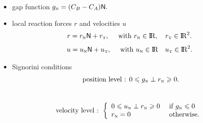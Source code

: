 {\begin{minipage}[c]{0.45\linewidth}
\begin{tikzpicture}
    \end{tikzpicture}
  \end{minipage}
\begin{minipage}[c]{0.49\linewidth}
    \begin{itemize}
    \item gap function $ g_{{\hbox{\tiny{N}}}} = (C_B-C_A) \sf N.$
    \item local reaction forces $r$ and  velocities $u$
      $$r =  r_{\hbox{\tiny{N}}} {\sf N} + r_{\hbox{\tiny{T}}}, \quad \text{ with  } r_{\hbox{\tiny{N}}} \in \mathrm{I\!R}, \quad r_{\hbox{\tiny{T}}} \in \mathrm{I\!R}^2.$$
      $$u =  u_{\hbox{\tiny{N}}} {\sf N} + u_{\hbox{\tiny{T}}}, \quad \text{ with } u_{\hbox{\tiny{N}}} \in \mathrm{I\!R} \quad u_{\hbox{\tiny{T}}} \in \mathrm{I\!R}^2.$$
    \item Signorini conditions
      $$  \text{ position level : }  0 \leqslant g_{{\hbox{\tiny{N}}}} \perp r_{\hbox{\tiny{N}}} \geqslant 0.$$\\
      $$ \text{velocity level : }\left\{\begin{array}{ll}
            0 \leqslant u_{{\hbox{\tiny{N}}}} \perp r_{\hbox{\tiny{N}}} \geqslant 0  &\text{ if } g_{{\hbox{\tiny{N}}}} \leqslant 0\\
            r_{{\hbox{\tiny{N}}}} =0 &\text{ otherwise}.
          \end{array}\right.$$
    \end{itemize}

  \end{minipage}\\[2mm]
}
